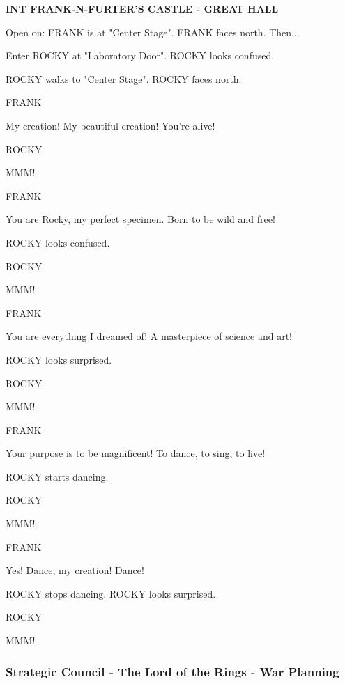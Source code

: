 \documentclass[11pt,letterpaper,oldstylefigures]{memoir}
\newcommand{\slugline}[1]{\nobreak\textbf{\MakeUppercase{#1}}\par\nobreak\vspace{1\baselineskip}}
\newcommand{\speaker}[1]{\nobreak\hspace*{0.333\textwidth}\MakeUppercase{#1}\par\nobreak\vspace{0.5\baselineskip}}
\newcommand{\dialogue}[1]{\nobreak\hspace*{0.25\textwidth}\begin{minipage}{0.5\textwidth}#1\end{minipage}\par\vspace{1\baselineskip}}
\newcommand{\stagedir}[1]{#1\par\vspace{1\baselineskip}}
\newenvironment{FountainExample}
  {\begingroup
  \ttfamily\small
   \setlength{\parindent}{0pt}
  \setlength{\parskip}{0.5em}
  \allowdisplaybreaks
  \setlength{\displaywidowpenalty}{0}
  \setlength{\widowpenalty}{0}
  \setlength{\clubpenalty}{0}
  \setlength{\interlinepenalty}{0}
}
  {\endgroup}
\begin{document}
\begin{FountainExample}
\slugline{INT FRANK-N-FURTER'S CASTLE - GREAT HALL}

\stagedir{Open on: FRANK is at "Center Stage". FRANK faces north. Then...}
\stagedir{Enter ROCKY at "Laboratory Door". ROCKY looks confused.}
\stagedir{ROCKY walks to "Center Stage". ROCKY faces north.}

\speaker{FRANK}
\dialogue{My creation! My beautiful creation! You're alive!}

\speaker{ROCKY}
\dialogue{MMM!}

\speaker{FRANK}
\dialogue{You are Rocky, my perfect specimen. Born to be wild and free!}

\stagedir{ROCKY looks confused.}

\speaker{ROCKY}
\dialogue{MMM!}

\speaker{FRANK}
\dialogue{You are everything I dreamed of! A masterpiece of science and art!}

\stagedir{ROCKY looks surprised.}

\speaker{ROCKY}
\dialogue{MMM!}

\speaker{FRANK}
\dialogue{Your purpose is to be magnificent! To dance, to sing, to live!}

\stagedir{ROCKY starts dancing.}

\speaker{ROCKY}
\dialogue{MMM!}

\speaker{FRANK}
\dialogue{Yes! Dance, my creation! Dance!}

\stagedir{ROCKY stops dancing. ROCKY looks surprised.}

\speaker{ROCKY}
\dialogue{MMM!}
\end{FountainExample}

\subsubsection*{Strategic Council - The Lord of the Rings - War Planning}
\label{ex:strategic-council-lord-of-the-rings}
\end{document}
